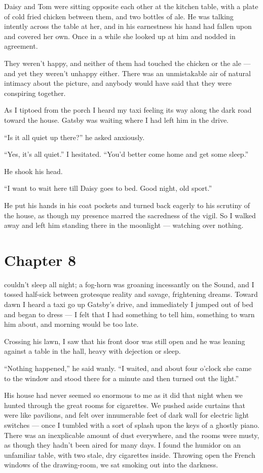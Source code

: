 \documentclass{znotebook}
\begin{document}
Daisy and Tom were sitting opposite each other at the kitchen table, with a plate of cold fried chicken between them, and two bottles of ale. He was talking intently across the table at her, and in his earnestness his hand had fallen upon and covered her own. Once in a while she looked up at him and nodded in agreement.

They weren't happy, and neither of them had touched the chicken or the ale ---{} and yet they weren't unhappy either. There was an unmistakable air of natural intimacy about the picture, and anybody would have said that they were conspiring together.

As I tiptoed from the porch I heard my taxi feeling its way along the dark road toward the house. Gatsby was waiting where I had left him in the drive.

``Is it all quiet up there?'' he asked anxiously.

``Yes, it's all quiet.'' I hesitated. ``You'd better come home and get some sleep.''

He shook his head.

``I want to wait here till Daisy goes to bed. Good night, old sport.''

He put his hands in his coat pockets and turned back eagerly to his scrutiny of the house, as though my presence marred the sacredness of the vigil. So I walked away and left him standing there in the moonlight ---{} watching over nothing.

\chapter{Chapter 8}

\lettrine[findent=2pt]{}{} couldn't sleep all night; a fog-horn was groaning incessantly on the Sound, and I tossed half-sick between grotesque reality and savage, frightening dreams. Toward dawn I heard a taxi go up Gatsby's drive, and immediately I jumped out of bed and began to dress ---{} I felt that I had something to tell him, something to warn him about, and morning would be too late.

Crossing his lawn, I saw that his front door was still open and he was leaning against a table in the hall, heavy with dejection or sleep.

``Nothing happened,'' he said wanly. ``I waited, and about four o'clock she came to the window and stood there for a minute and then turned out the light.''

His house had never seemed so enormous to me as it did that night when we hunted through the great rooms for cigarettes. We pushed aside curtains that were like pavilions, and felt over innumerable feet of dark wall for electric light switches ---{} once I tumbled with a sort of splash upon the keys of a ghostly piano. There was an inexplicable amount of dust everywhere, and the rooms were musty, as though they hadn't been aired for many days. I found the humidor on an unfamiliar table, with two stale, dry cigarettes inside. Throwing open the French windows of the drawing-room, we sat smoking out into the darkness.
\end{document}
